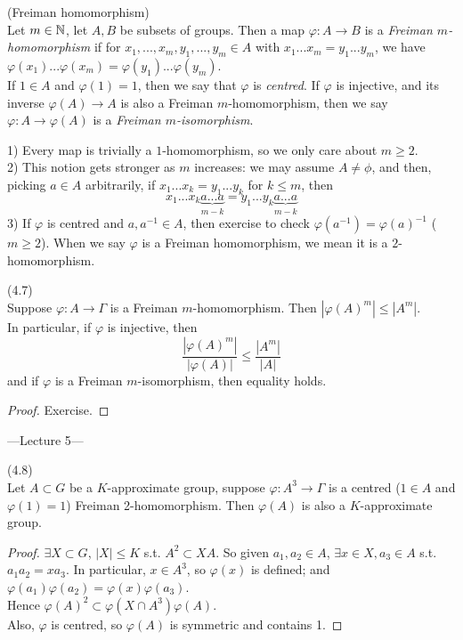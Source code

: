\documentclass[a4paper]{article}
\begin{document}
\begin{defi} (Freiman homomorphism)\\
Let $m \in \mathbb{N}$, let $A,B$ be subsets of groups. Then a map $\varphi:A \to B$ is a \emph{Freiman $m$-homomorphism} if for $x_1,...,x_m,y_1,...,y_m \in A$ with $x_1...x_m = y_1...y_m$, we have $\varphi(x_1)...\varphi(x_m) = \varphi(y_1)...\varphi(y_m)$.\\
If $1 \in A$ and $\varphi(1) = 1$, then we say that $\varphi$ is \emph{centred}. If $\varphi$ is injective, and its inverse $\varphi(A) \to A$ is also a Freiman $m$-homomorphism, then we say $\varphi:A \to \varphi(A)$ is a \emph{Freiman $m$-isomorphism}.
\end{defi}

\begin{rem}
1) Every map is trivially a $1$-homomorphism, so we only care about $m \geq 2$.\\
2) This notion gets stronger as $m$ increases: we may assume $A \neq \phi$, and then, picking $a \in A$ arbitrarily, if $x_1...x_k = y_1...y_k$ for $k \leq m$, then 
\[
x_1...x_k \underbrace{a...a}_{m-k} = y_1...y_k \underbrace{a...a}_{m-k}
\]
3) If $\varphi$ is centred and $a,a^{-1} \in A$, then exercise to check $\varphi(a^{-1}) = \varphi(a)^{-1}$ ($m \geq 2$). When we say $\varphi$ is a Freiman homomorphism, we mean it is a $2$-homomorphism.
\end{rem}

\begin{lemma} (4.7)\\
Suppose $\varphi:A \to \Gamma$ is a Freiman $m$-homomorphism. Then $|\varphi(A)^m| \leq |A^m|$.\\
In particular, if $\varphi$ is injective, then
\[
\frac{|\varphi(A)^m|}{|\varphi(A)|} \leq \frac{|A^m|}{|A|}
\]
and if $\varphi$ is a Freiman $m$-isomorphism, then equality holds.
\end{lemma}
\begin{proof}
Exercise.
\end{proof}

---Lecture 5---

\begin{lemma} (4.8)\\
Let $A \subset G$ be a $K$-approximate group, suppose $\varphi:A^3 \to \Gamma$ is a centred ($1 \in A$ and $\varphi(1) = 1$) Freiman 2-homomorphism. Then $\varphi(A)$ is also a $K$-approximate group.
\begin{proof}
$\exists X \subset G$, $|X| \leq K$ s.t. $A^2 \subset XA$. So given $a_1,a_2 \in A$, $\exists x \in X, a_3 \in A$ s.t. $a_1a_2 = xa_3$. In particular, $x \in A^3$, so $\varphi(x)$ is defined; and $\varphi(a_1)\varphi(a_2) = \varphi(x) \varphi(a_3)$.\\
Hence $\varphi(A)^2 \subset \varphi(X \cap A^3) \varphi(A)$.\\
Also, $\varphi$ is centred, so $\varphi(A)$ is symmetric and contains 1.
\end{proof}
\end{lemma}
\end{document}
